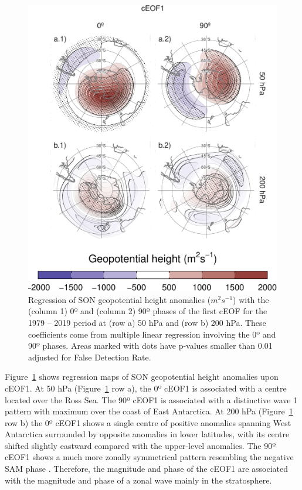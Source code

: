 \documentclass[pdflatex,sn-basic]{sn-jnl}
\theoremstyle{thmstyleone}%
\theoremstyle{thmstyletwo}%
\theoremstyle{thmstylethree}%
\begin{document}
\begin{figure}
\centering
\includegraphics{../figures/eof1-regr-gh-1.pdf}
\caption{\label{fig:eof1-regr-gh}Regression of SON geopotential height anomalies (\(m^2s^{-1}\)) with the (column 1) 0º and (column 2) 90º phases of the first cEOF for the 1979 -- 2019 period at (row a) 50 hPa and (row b) 200 hPa. These coefficients come from multiple linear regression involving the 0º and 90º phases. Areas marked with dots have p-values smaller than 0.01 adjusted for False Detection Rate.}
\end{figure}

Figure~\ref{fig:eof1-regr-gh} shows regression maps of SON geopotential height anomalies upon cEOF1.
At 50 hPa (Figure~\ref{fig:eof1-regr-gh} row a), the 0º cEOF1 is associated with a centre located over the Ross Sea.
The 90º cEOF1 is associated with a distinctive wave 1 pattern with maximum over the coast of East Antarctica.
At 200 hPa (Figure~\ref{fig:eof1-regr-gh} row b) the 0º cEOF1 shows a single centre of positive anomalies spanning West Antarctica surrounded by opposite anomalies in lower latitudes, with its centre shifted slightly eastward compared with the upper-level anomalies.
The 90º cEOF1 shows a much more zonally symmetrical pattern resembling the negative SAM phase \citep[e.g.][]{fogt2020}.
Therefore, the magnitude and phase of the cEOF1 are associated with the magnitude and phase of a zonal wave mainly in the stratosphere.
\end{document}
